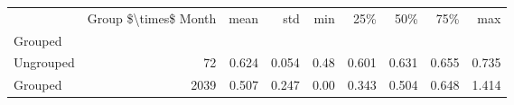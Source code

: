 \begin{tabular}{lrrrrrrrr}
\toprule
{} &  Group \$\textbackslash times\$ Month &   mean &    std &   min &    25\% &    50\% &    75\% &    max \\
Grouped   &                       &        &        &       &        &        &        &        \\
\midrule
Ungrouped &                    72 &  0.624 &  0.054 &  0.48 &  0.601 &  0.631 &  0.655 &  0.735 \\
Grouped   &                  2039 &  0.507 &  0.247 &  0.00 &  0.343 &  0.504 &  0.648 &  1.414 \\
\bottomrule
\end{tabular}
